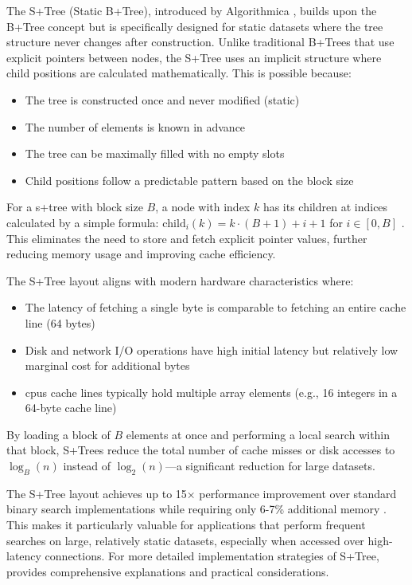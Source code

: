 The S+Tree (Static B+Tree), introduced by Algorithmica \citep{static_b_trees}, builds upon the B+Tree concept but is specifically designed for static datasets where the tree structure never changes after construction. Unlike traditional B+Trees that use explicit pointers between nodes, the S+Tree uses an implicit structure where child positions are calculated mathematically.
This is possible because:
\begin{itemize}
  \item The tree is constructed once and never modified (static)
  \item The number of elements is known in advance
  \item The tree can be maximally filled with no empty slots
  \item Child positions follow a predictable pattern based on the block size
\end{itemize}

For a \ac{s+tree} with block size $B$, a node with index $k$ has its children at indices calculated by a simple formula: $\text{child}_i(k) = k \cdot (B+1) + i + 1$ for $i \in [0, B]$ \citep{static_b_trees}. This eliminates the need to store and fetch explicit pointer values, further reducing memory usage and improving cache efficiency.

The S+Tree layout aligns with modern hardware characteristics where:
\begin{itemize}
  \item The latency of fetching a single byte is comparable to fetching an entire cache line (64 bytes)
  \item Disk and network I/O operations have high initial latency but relatively low marginal cost for additional bytes
  \item \acp{cpu} cache lines typically hold multiple array elements (e.g., 16 integers in a 64-byte cache line)
\end{itemize}

By loading a block of $B$ elements at once and performing a local search within that block, S+Trees reduce the total number of cache misses or disk accesses to $\log_B(n)$ instead of $\log_2(n)$—a significant reduction for large datasets.

The S+Tree layout achieves up to 15× performance improvement over standard binary search implementations while requiring only 6-7\% additional memory \citep{static_b_trees}. This makes it particularly valuable for applications that perform frequent searches on large, relatively static datasets, especially when accessed over high-latency connections. For more detailed implementation strategies of S+Tree, \citet{koerkamp_2024} provides comprehensive explanations and practical considerations.